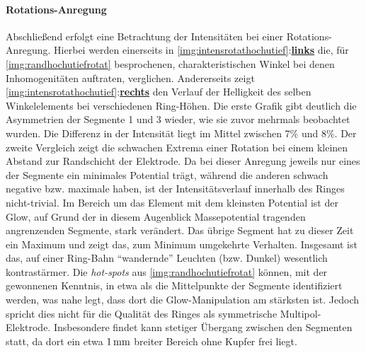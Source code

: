 \documentclass[numbers=noenddot,a4paper,notitlepage,twoside,BCOR15mm]{scrbook}
\newcommand{\tilt}[1]{\textit{#1}}
\newcommand{\fett}[1]{\textbf{#1}}
\begin{document}
				\paragraph{Rotations-Anregung}

					Abschließend erfolgt eine Betrachtung der Intensitäten bei einer Rotations-Anregung. Hierbei werden einerseits in \autoref{img:intensrotathochutief}:\underline{\fett{links}} die, für \autoref{img:randhochutiefrotat} besprochenen, charakteristischen Winkel bei denen Inhomogenitäten auftraten, verglichen. Andererseits zeigt \autoref{img:intensrotathochutief}:\underline{\fett{rechts}} den Verlauf der Helligkeit des selben Winkelelements bei verschiedenen Ring-Höhen. Die erste Grafik gibt deutlich die Asymmetrien der Segmente 1 und 3 wieder, wie sie zuvor mehrmals beobachtet wurden. Die Differenz in der Intensität liegt im Mittel zwischen 7\% und 8\%. Der zweite Vergleich zeigt die schwachen Extrema einer Rotation bei einem kleinen Abstand zur Randschicht der Elektrode. Da bei dieser Anregung jeweils nur eines der Segmente ein minimales Potential tr\"agt, w\"ahrend die anderen schwach negative bzw. maximale haben, ist der Intensitätsverlauf innerhalb des Ringes nicht-trivial. Im Bereich um das Element mit dem kleinsten Potential ist der Glow, auf Grund der in diesem Augenblick Massepotential tragenden angrenzenden Segmente, stark verändert. Das \"ubrige Segment hat zu dieser Zeit ein Maximum und zeigt das, zum Minimum umgekehrte Verhalten. Insgesamt ist das, auf einer Ring-Bahn ``wandernde'' Leuchten (bzw. Dunkel) wesentlich kontrast\"armer. Die \tilt{hot-spots} aus \autoref{img:randhochutiefrotat} k\"onnen, mit der gewonnenen Kenntnis, in etwa als die Mittelpunkte der Segmente identifiziert werden, was nahe legt, dass dort die Glow-Manipulation am st\"arksten ist. Jedoch spricht dies nicht f\"ur die Qualit\"at des Ringes als symmetrische Multipol-Elektrode. Insbesondere findet kann stetiger Übergang zwischen den Segmenten statt, da dort ein etwa $\unit[1]{mm}$ breiter Bereich ohne Kupfer frei liegt.

\end{document}
